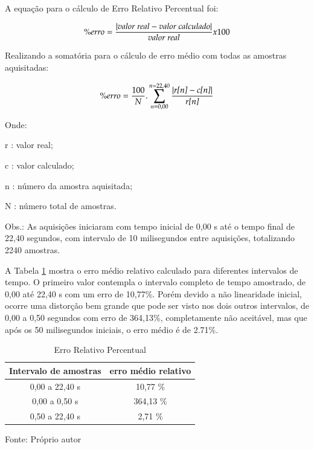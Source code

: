A equação para o cálculo de Erro Relativo Percentual foi:

\begin{equation}
 \% erro = \frac{| \text{\emph{valor real}} -\text{\emph{valor calculado}} |}{\text{\emph{valor real}}} x 100
\end{equation}

Realizando a somatória para o cálculo de erro médio com todas as amostras aquisitadas: 

\begin{equation}
 \% erro = \frac{100}{N} . \sum_{n = 0,00}^{n=22,40} {\frac{| \text{\emph{r[n]}} -\text{\emph{c[n]}} |}{\text{\emph{r[n]}}} } 
\end{equation}


Onde:

\setlength{\parindent}{2cm}
r : valor real; 

c : valor calculado;

n : número da amostra aquisitada;

N : número total de amostras.

Obs.: As aquisições iniciaram com tempo inicial de 0,00 s até o tempo final de 22,40 segundos, com intervalo de 10 milisegundos entre aquisições, totalizando 2240 amostras.

\setlength{\parindent}{1cm}

A Tabela \ref{tab:ErroModelo} mostra o erro médio relativo calculado para diferentes intervalos de tempo. O primeiro valor contempla o intervalo completo de tempo amostrado, de 0,00 até 22,40 s com um erro de 10,77\%. Porém devido a não linearidade inicial, ocorre uma distorção bem grande que pode ser visto nos dois outros intervalos, de 0,00 a 0,50 segundos com erro de 364,13\%, completamente não aceitável, mas que após os 50 milisegundos iniciais, o erro médio é de 2.71\%. 


\begin{table}[h]
\centering
\caption{Erro Relativo Percentual}
\label{tab:ErroModelo}

\begin{tabular}{c|c}
\hline
Intervalo de amostras  &  erro médio relativo \\ \hline
\hline
0,00 a 22,40 s  &   10,77 \% \\ \hline
0,00 a  0,50 s 	&  364,13 \% \\ \hline
0,50 a 22,40 s  &    2,71 \% \\ \hline

\end{tabular}

{\small Fonte: Próprio autor}
\end{table}



